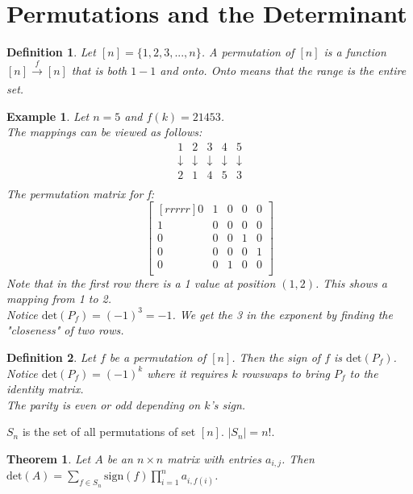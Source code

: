 \documentclass{report}
\newtheorem*{ex}{Example}
\newtheorem*{defn}{Definition}
\newtheorem*{thrm}{Theorem}
\begin{document}
\section{Permutations and the Determinant}
\begin{defn}
Let $[n]=\{1,2,3,...,n\}$. A permutation of $[n]$ is a function $[n]\xrightarrow[]{f} [n]$ that is both $1-1$ and onto. Onto means that the range is the entire set.
\end{defn}
\begin{ex}
Let $n=5$ and $f(k)=21453$.\\
The mappings can be viewed as follows:
\[ \begin{matrix}1&2&3&4&5\\\downarrow&\downarrow&\downarrow&\downarrow&\downarrow\\2&1&4&5&3\\\end{matrix} \]
The permutation matrix for f:
\[ \begin{bmatrix}[rrrrr]0&1&0&0&0\\1&0&0&0&0\\0&0&0&1&0\\0&0&0&0&1\\0&0&1&0&0\\\end{bmatrix} \]
Note that in the first row there is a 1 value at position $(1,2)$. This shows a mapping from 1 to 2.\\
Notice $\mathrm{det}(P_f)=(-1)^3 = -1$. We get the 3 in the exponent by finding the "closeness" of two rows.
\end{ex}
\begin{defn}
Let $f$ be a permutation of $[n]$. Then the sign of $f$ is $\mathrm{det}(P_f)$.\\
Notice $\mathrm{det}(P_f)=(-1)^k$ where it requires $k$ rowswaps to bring $P_f$ to the identity matrix.\\
The parity is even or odd depending on $k$'s sign.
\end{defn}
$S_n$ is the set of all permutations of set $[n]$. $|S_n| = n!$.
\begin{thrm}
Let $A$ be an $n \times n$ matrix with entries $a_{i,j}$. Then $\mathrm{det}(A)=\sum_{f\in S_n} \mathrm{sign}(f) \prod_{i=1}^na_{i,f(i)}$.
\end{thrm}
\end{document}
